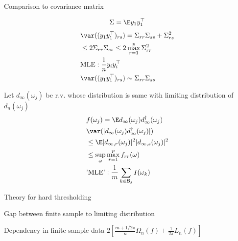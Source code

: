 \documentclass[handout,xcolor={usenames,dvipsnames}]{beamer}
\begin{document}
\begin{frame}{Comparison to covariance matrix}
\begin{minipage}{.45\textwidth}
\[
\Sigma =  \E y_1y_1^\top 
\]
\begin{equation*}
\begin{aligned}
&\var((y_1y_1^\top)_{rs}) = \Sigma_{rr}\Sigma_{ss}+ \Sigma^2_{rs}\\
& \le 2\Sigma_{rr}\Sigma_{ss} \le 2\max_{r=1}^p\Sigma^2_{rr}\\
& \text{MLE}:  \frac{1}{n} y_i y_i^\top \\ 
& \var((y_1y_1^\top)_{rs}) \sim \Sigma_{rr}\Sigma_{ss} 
\end{aligned}
\end{equation*}

\end{minipage}
\hfill 
\begin{minipage}{.45\textwidth}
Let $d_{\infty}(\omega_j)$ be r.v. whose distribution is same with limiting distribution of $d_n(\omega_j)$
\begin{equation}
\begin{aligned}
& f(\omega_j) = \E d_{\infty}(\omega_j) d^\dag_{\infty}(\omega_j)  \\
& \var(|d_{\infty}(\omega_j) d^\dag_{\infty}(\omega_j)| )\\
& \le \E |d_{\infty, r}(\omega_j)|^2|d_{\infty, s}(\omega_j)|^2\\
& \le \sup_{\omega}\max_{r=1}^p f_{rr}(\omega)\\
& \text{'MLE'}: \frac{1}{m} \sum_{k\in \mathcal{B}_j} I(\omega_k)\\
\end{aligned}
\end{equation}
\end{minipage}
\end{frame}




\begin{frame}{Theory for hard thresholding}
\bit
\item Gap between finite sample to limiting distribution
\item Dependency in finite sample data 
\eit
{} $2\left[ \frac{m+1/2\pi}{n}\Omega_n(f)+\frac{1}{2\pi}L_n(f)\right]$
\end{frame}

\newcommand{\vertiii}[1]{{\left\vert\kern-0.25ex\left\vert\kern-0.25ex\left\vert #1 
		\right\vert\kern-0.25ex\right\vert\kern-0.25ex\right\vert}}
\end{document}
